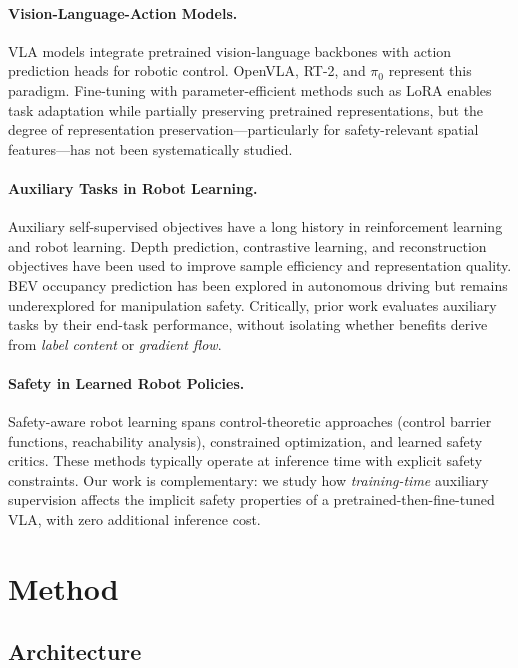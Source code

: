 \documentclass[letterpaper]{article}
\begin{document}
\paragraph{Vision-Language-Action Models.}
VLA models integrate pretrained vision-language backbones with action prediction heads for robotic control. OpenVLA, RT-2, and $\pi_0$ represent this paradigm. Fine-tuning with parameter-efficient methods such as LoRA enables task adaptation while partially preserving pretrained representations, but the degree of representation preservation---particularly for safety-relevant spatial features---has not been systematically studied.

\paragraph{Auxiliary Tasks in Robot Learning.}
Auxiliary self-supervised objectives have a long history in reinforcement learning and robot learning. Depth prediction, contrastive learning, and reconstruction objectives have been used to improve sample efficiency and representation quality. BEV occupancy prediction has been explored in autonomous driving but remains underexplored for manipulation safety. Critically, prior work evaluates auxiliary tasks by their end-task performance, without isolating whether benefits derive from \emph{label content} or \emph{gradient flow}.

\paragraph{Safety in Learned Robot Policies.}
Safety-aware robot learning spans control-theoretic approaches (control barrier functions, reachability analysis), constrained optimization, and learned safety critics. These methods typically operate at inference time with explicit safety constraints. Our work is complementary: we study how \emph{training-time} auxiliary supervision affects the implicit safety properties of a pretrained-then-fine-tuned VLA, with zero additional inference cost.

\section{Method}
\label{sec:method}

\subsection{Architecture}
\end{document}
